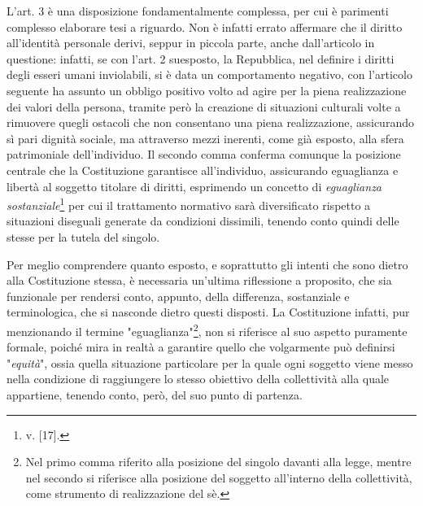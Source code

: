 L'art. 3 è una disposizione fondamentalmente complessa, per cui è parimenti complesso elaborare tesi a riguardo. Non è infatti errato affermare che il diritto all'identità personale derivi, seppur in piccola parte, anche dall'articolo in questione: infatti, se con l'art. 2 suesposto, la Repubblica, nel definire i diritti degli esseri umani inviolabili, si è data un comportamento negativo, con l'articolo seguente ha assunto un obbligo positivo volto ad agire per la piena realizzazione dei valori della persona, tramite però la creazione di situazioni culturali volte a rimuovere quegli ostacoli che non consentano una piena realizzazione, assicurando sì pari dignità sociale, ma attraverso mezzi inerenti, come già esposto, alla sfera patrimoniale dell'individuo. Il secondo comma conferma comunque la posizione centrale che la Costituzione garantisce all'individuo, assicurando eguaglianza e libertà al soggetto titolare di diritti, esprimendo un concetto di \textit{eguaglianza sostanziale}\footnote{v. [17].} per cui il trattamento normativo sarà diversificato rispetto a situazioni diseguali generate da condizioni dissimili, tenendo conto quindi delle stesse per la tutela del singolo. 

Per meglio comprendere quanto esposto, e soprattutto gli intenti che sono dietro alla Costituzione stessa, è necessaria un'ultima riflessione a proposito, che sia funzionale per rendersi conto, appunto, della differenza, sostanziale e terminologica, che si nasconde dietro questi disposti. La Costituzione infatti, pur menzionando il termine "eguaglianza"\footnote{Nel primo comma riferito alla posizione del singolo davanti alla legge, mentre nel secondo si riferisce alla posizione del soggetto all'interno della collettività, come strumento di realizzazione del sè.}, non si riferisce al suo aspetto puramente formale, poiché mira in realtà a garantire quello che volgarmente può definirsi "\textit{equità}", ossia quella situazione particolare per la quale ogni soggetto viene messo nella condizione di raggiungere lo stesso obiettivo della collettività alla quale appartiene, tenendo conto, però, del suo punto di partenza.


